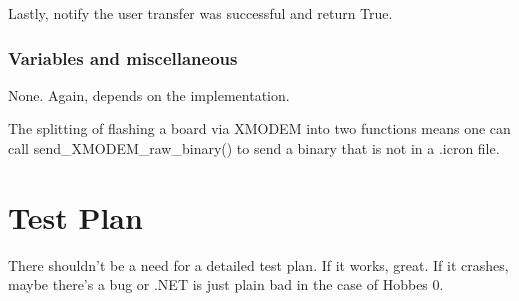 \documentclass[12pt,letterpaper]{article}
\begin{document}
Lastly, notify the user transfer was successful and return True.



%
%
\subsubsection{Variables and miscellaneous}
\label{4.9.2}

None. Again, depends on the implementation.

The splitting of flashing a board via XMODEM into two functions means one can call send\_XMODEM\_raw\_binary() to send a binary that is not in a .icron file.



%
%
\section{Test Plan}
\label{5}

There shouldn't be a need for a detailed test plan. If it works, great. If it crashes, maybe there's a bug or .NET is just plain bad in the case of Hobbes 0.
\end{document}
